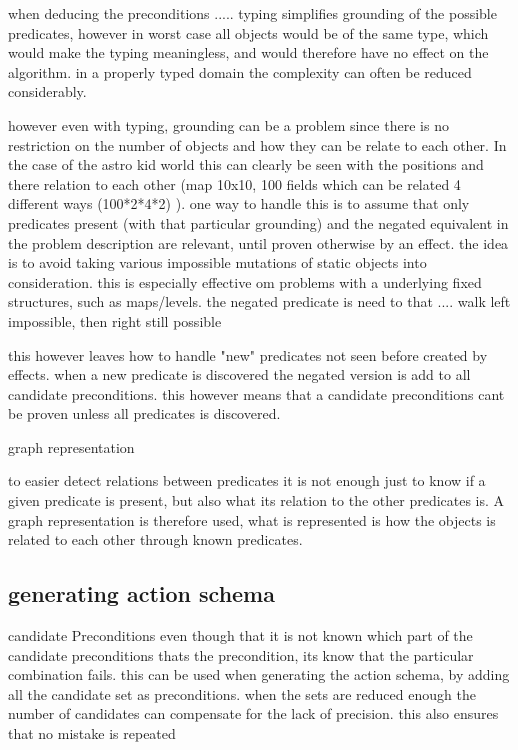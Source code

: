 			
	when deducing the preconditions ..... typing simplifies grounding of the possible predicates, however in worst case all objects would be of the same type, which would make the typing meaningless, and would therefore have no effect on the algorithm. 
	in a properly typed domain the complexity can often be reduced considerably.
	
	
	however even with typing, grounding can be a problem since there is no restriction on the number of objects and how they can be relate to each other. In the case of the astro kid world this can clearly be seen with the positions and there relation to each other (map 10x10, 100 fields which can be related 4 different ways (100*2*4*2) ).
	one way to handle this is to assume that only predicates present (with that particular grounding) and the negated equivalent in the problem description are relevant, until proven otherwise by an effect. the idea is to avoid taking various impossible mutations of static objects into consideration. this is especially effective om problems with a underlying fixed structures, such as maps/levels. the negated predicate is need to that .... walk left impossible, then right still possible
	
	this however leaves how to handle "new" predicates not seen before created by effects. when a new predicate is discovered the negated version is add to all candidate preconditions. this however means that a candidate preconditions cant be proven unless all predicates is discovered. 

	graph representation
	
	to easier detect relations between predicates it is not enough just to know if a given predicate is present, but also what its relation to the other predicates is. A graph representation is therefore used, what is represented is how the objects is related to each other through known predicates.

\subsection{generating action schema}
candidate
Preconditions
even though that it is not known which part of the candidate preconditions thats the precondition, its know that the particular combination fails. this can be used when generating the action schema, by adding all the candidate set as preconditions. when the sets are reduced enough the number of candidates can compensate for the lack of precision. this also ensures that no mistake is repeated


